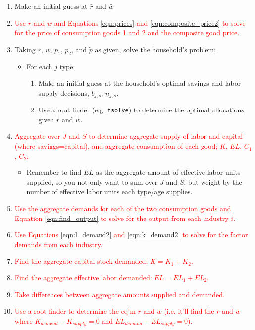 \documentclass[letterpaper,12pt]{article}
\theoremstyle{definition}
\begin{document}
\begin{spacing}{1.5}
\begin{enumerate}
\item Make an initial guess at $\bar{r}$ and $\bar{w}$
\item \textcolor{red}{Use $r$ and $w$ and Equations \ref{eqn:prices} and \ref{eqn:composite_price2} to solve for the price of consumption goods 1 and 2 and the composite good price.}
\item Taking $\bar{r}$, $\bar{w}$, $p_{1}$, $p_{2}$, and $\tilde{p}$ as given, solve the household's problem:
	\begin{itemize}
	\item For each $j$ type:
		\begin{enumerate}
		\item Make an initial guess at the household's optimal savings and labor supply decisions, $b_{j,s}$, $n_{j,s}$.
		\item Use a root finder (e.g. \texttt{fsolve}) to determine the optimal allocations given $\bar{r}$ and $\bar{w}$.
		\end{enumerate}
	\end{itemize}
\item \textcolor{red}{Aggregate over $J$ and $S$ to determine aggregate supply of labor and capital (where savings=capital), and aggregate consumption of each good; $K$, $EL$, $C_{1}$, $C_{2}$.}
	\begin{itemize}
	\item Remember to find $EL$ as the aggregate amount of effective labor units supplied, so you not only want to sum over $J$ and $S$, but weight by the number of effective labor units each type/age supplies.
	\end{itemize}
\item \textcolor{red}{Use the aggregate demands for each of the two consumption goods and Equation \ref{eqn:find_output} to solve for the output from each industry $i$.}
\item \textcolor{red}{Use Equations \ref{eqn:l_demand2} and \ref{eqn:k_demand2} to solve for the factor demands from each industry.}
\item \textcolor{red}{Find the aggregate capital stock demanded: $K = K_{1}+K_{2}$.}
\item \textcolor{red}{Find the aggregate effective labor demanded: $EL = EL_{1}+EL_{2}$.}
\item \textcolor{red}{Take differences between aggregate amounts supplied and demanded.}
\item \textcolor{red}{Use a root finder to determine the eq'm $\bar{r}$ and $\bar{w}$ (i.e. it'll find the $\bar{r}$ and $\bar{w}$ where $K_{demand}-K_{supply}=0$ and $EL_{demand}-EL_{supply}=0$).}
\end{enumerate}


\end{spacing}
\end{document}
